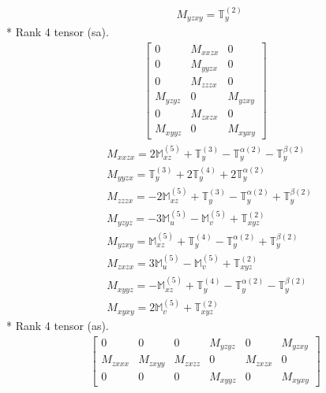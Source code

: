 \documentclass[fleqn,8pt,landscape]{jsarticle}
\begin{document}
\begin{align*}
& M_{yzxy} = \mathbb{T}_{y}^{(2)}
\end{align*}
* Rank 4 tensor (sa).
\begin{align*}
\begin{bmatrix} 0 & M_{xxzx} & 0 \\ 0 & M_{yyzx} & 0 \\ 0 & M_{zzzx} & 0 \\ M_{yzyz} & 0 & M_{yzxy} \\ 0 & M_{zxzx} & 0 \\ M_{xyyz} & 0 & M_{xyxy} \end{bmatrix}
\end{align*}
\begin{align*}
& M_{xxzx} = 2 \mathbb{M}_{xz}^{(5)} + \mathbb{T}_{y}^{(3)} - \mathbb{T}_{y}^{\alpha(2)} - \mathbb{T}_{y}^{\beta(2)} \\
& M_{yyzx} = \mathbb{T}_{y}^{(3)} + 2 \mathbb{T}_{y}^{(4)} + 2 \mathbb{T}_{y}^{\alpha(2)} \\
& M_{zzzx} = - 2 \mathbb{M}_{xz}^{(5)} + \mathbb{T}_{y}^{(3)} - \mathbb{T}_{y}^{\alpha(2)} + \mathbb{T}_{y}^{\beta(2)} \\
& M_{yzyz} = - 3 \mathbb{M}_{u}^{(5)} - \mathbb{M}_{v}^{(5)} + \mathbb{T}_{xyz}^{(2)} \\
& M_{yzxy} = \mathbb{M}_{xz}^{(5)} + \mathbb{T}_{y}^{(4)} - \mathbb{T}_{y}^{\alpha(2)} + \mathbb{T}_{y}^{\beta(2)} \\
& M_{zxzx} = 3 \mathbb{M}_{u}^{(5)} - \mathbb{M}_{v}^{(5)} + \mathbb{T}_{xyz}^{(2)} \\
& M_{xyyz} = - \mathbb{M}_{xz}^{(5)} + \mathbb{T}_{y}^{(4)} - \mathbb{T}_{y}^{\alpha(2)} - \mathbb{T}_{y}^{\beta(2)} \\
& M_{xyxy} = 2 \mathbb{M}_{v}^{(5)} + \mathbb{T}_{xyz}^{(2)}
\end{align*}
* Rank 4 tensor (as).
\begin{align*}
\begin{bmatrix} 0 & 0 & 0 & M_{yzyz} & 0 & M_{yzxy} \\ M_{zxxx} & M_{zxyy} & M_{zxzz} & 0 & M_{zxzx} & 0 \\ 0 & 0 & 0 & M_{xyyz} & 0 & M_{xyxy} \end{bmatrix}
\end{align*}
\end{document}
